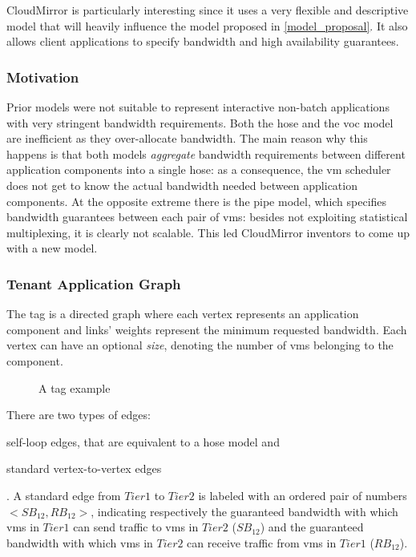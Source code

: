 CloudMirror \cite{cloudmirror} is particularly interesting since it uses a very flexible and descriptive \gls{model} that will heavily influence the model proposed in \autoref{model_proposal}.
It also allows client applications to specify bandwidth and high availability guarantees.

\subsubsection{Motivation} \label{why_tag}
Prior \glspl{model} were not suitable to represent interactive non-batch applications with very stringent bandwidth requirements.
Both the hose and the \gls{voc} model are inefficient as they over-allocate bandwidth.
The main reason why this happens is that both models \textit{aggregate} bandwidth requirements between different application components into a single hose: as a consequence, the \gls{vm} scheduler does not get to know the actual bandwidth needed between application components.
At the opposite extreme there is the pipe model, which specifies bandwidth guarantees between each pair of \glspl{vm}: besides not exploiting statistical multiplexing, it is clearly not scalable.
This led CloudMirror \cite{cloudmirror} inventors to come up with a new model.

\subsubsection{Tenant Application Graph} \label{tag_description}
The \gls{tag} is a directed graph where each vertex represents an application component and links' weights represent the minimum requested bandwidth.
Each vertex can have an optional \textit{size}, denoting the number of \glspl{vm} belonging to the component.

\begin{figure}[!htb]
    \centering
    \usebox{\tagfigure}
    \caption{A \gls{tag} example}
\end{figure}

There are two types of edges:
\begin{mylist}
    \item self-loop edges, that are equivalent to a hose model and
    \item standard vertex-to-vertex edges
\end{mylist}.
A standard edge from $Tier 1$ to $Tier 2$ is labeled with an ordered pair of numbers $<SB_{12}, RB_{12}>$, indicating respectively the guaranteed bandwidth with which \glspl{vm} in $Tier 1$ can send traffic to \glspl{vm} in $Tier 2$ ($SB_{12}$) and the guaranteed bandwidth with which \glspl{vm} in $Tier 2$ can receive traffic from \glspl{vm} in $Tier 1$ ($RB_{12}$).

